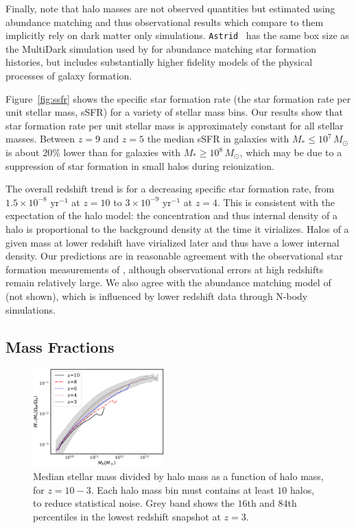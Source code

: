 \documentclass[fleqn,usenatbib]{mnras}
\def\astrid{\texttt{Astrid} }
\def\msun{\, M_{\odot}}
\begin{document}
Finally, note that halo masses are not observed quantities but estimated using abundance matching and thus observational results which compare to them implicitly rely on dark matter only simulations. \astrid~has the same box size as the MultiDark simulation \citep{2016MNRAS.457.4340K} used by \cite{2019MNRAS.488.3143B} for abundance matching star formation histories, but includes substantially higher fidelity models of the physical processes of galaxy formation.

Figure~\ref{fig:ssfr} shows the specific star formation rate (the star formation rate per unit stellar mass, sSFR) for a variety of stellar mass bins. Our results show that star formation rate per unit stellar mass is approximately constant for all stellar masses. Between $z=9$ and $z=5$ the median sSFR in galaxies with $M_* \leq 10^7 \msun$ is about $20\%$ lower than for galaxies with $M_* \geq 10^8 \msun$, which may be due to a suppression of star formation in small halos during reionization. 

The overall redshift trend is for a decreasing specific star formation rate, from $1.5 \times 10^{-8}$ yr$^{-1}$ at $z=10$ to $3 \times 10^{-9}$ yr$^{-1}$ at $z=4$. This is consistent with the expectation of the halo model: the concentration and thus internal density of a halo is proportional to the background density at the time it virializes. Halos of a given mass at lower redshift have virialized later and thus have a lower internal density. Our predictions are in reasonable agreement with the observational star formation measurements of \cite{2015ApJ...799..183S}, although observational errors at high redshifts remain relatively large. We also agree with the abundance matching model of \cite{2013ApJ...770...57B} (not shown), which is influenced by lower redshift data through N-body simulations.

\subsection{Mass Fractions}

\begin{figure}
\centering
  \includegraphics[width=0.45\textwidth]{plots/smhms.pdf}    
  \caption{Median stellar mass divided by halo mass as a function of halo mass, for $z=10-3$. Each halo mass bin must contains at least $10$ halos, to reduce statistical noise. Grey band shows the $16$th and $84$th percentiles in the lowest redshift snapshot at $z=3$.}  
  \label{fig:smhm}
\end{figure}
\end{document}
